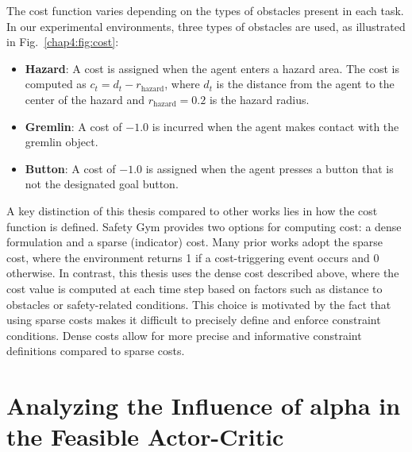 The cost function varies depending on the types of obstacles present in each task.
In our experimental environments, three types of obstacles are used, as illustrated in Fig.~\ref{chap4:fig:cost}:
\begin{itemize}
    \item \textbf{Hazard}: A cost is assigned when the agent enters a hazard area. The cost is computed as $c_t = d_t - r_{\text{hazard}}$, where $d_t$ is the distance from the agent to the center of the hazard and $r_{\text{hazard}} = 0.2$ is the hazard radius.
    \item \textbf{Gremlin}: A cost of $-1.0$ is incurred when the agent makes contact with the gremlin object.
    \item \textbf{Button}: A cost of $-1.0$ is assigned when the agent presses a button that is not the designated goal button.
\end{itemize}
A key distinction of this thesis compared to other works lies in how the cost function is defined.
Safety Gym provides two options for computing cost: a dense formulation and a sparse (indicator) cost.
Many prior works adopt the sparse cost, where the environment returns 1 if a cost-triggering event occurs and 0 otherwise.
In contrast, this thesis uses the dense cost described above, where the cost value is computed at each time step based on factors such as distance to obstacles or safety-related conditions.
This choice is motivated by the fact that using sparse costs makes it difficult to precisely define and enforce constraint conditions.
Dense costs allow for more precise and informative constraint definitions compared to sparse costs.

\section{Analyzing the Influence of alpha in the Feasible Actor-Critic} \label{chap4:sec:experiments:fac}

